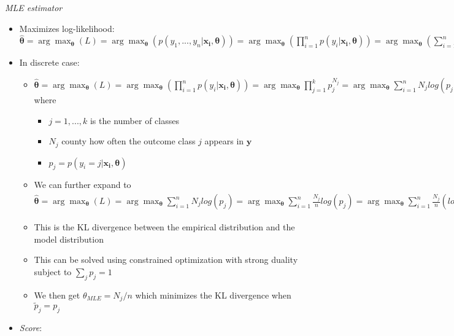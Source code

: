 \emph{MLE estimator}
\begin{itemize}
    \item Maximizes log-likelihood: $\hat{\boldsymbol{\theta}} = \arg\max_{\boldsymbol{\theta}}(L) = \arg\max_{\boldsymbol{\theta}}(p(y_1, ..., y_n |\boldsymbol{x_i}, \boldsymbol{\theta})) = \arg\max_{\boldsymbol{\theta}}(\prod_{i=1}^n p(y_i |\boldsymbol{x_i}, \boldsymbol{\theta})) = \arg\max_{\boldsymbol{\theta}}(\sum_{i=1}^n log(p(y_i |\boldsymbol{x_i}, \boldsymbol{\theta})))$
    \item In discrete case:
    \begin{itemize}
        \item $\hat{\boldsymbol{\theta}} = \arg\max_{\boldsymbol{\theta}}(L) = \arg\max_{\boldsymbol{\theta}}(\prod_{i=1}^n p(y_i |\boldsymbol{x_i}, \boldsymbol{\theta})) = \arg\max_{\boldsymbol{\theta}}\prod_{j=1}^k p_j^{N_j} = \arg\max_{\boldsymbol{\theta}} \sum_{i=1}^n N_j log(p_j)$ where
        \begin{itemize}
            \item $j = 1, ..., k$ is the number of classes
            \item $N_j$ county how often the outcome class $j$ appears in $\boldsymbol{y}$
            \item $p_j = p(y_i = j |\boldsymbol{x_i}, \boldsymbol{\theta})$
        \end{itemize}
        \item We can further expand to $\hat{\boldsymbol{\theta}} = \arg\max_{\boldsymbol{\theta}}(L) = \arg\max_{\boldsymbol{\theta}} \sum_{i=1}^n N_j log(p_j) = \arg\max_{\boldsymbol{\theta}} \sum_{i=1}^n \frac{N_j}{n} log(p_j) = \arg\max_{\boldsymbol{\theta}} \sum_{i=1}^n \frac{N_j}{n} (log(\frac{p_j}{N_j/n}) + log(N_j/n)) = \arg\max_{\boldsymbol{\theta}} \sum_{i=1}^n \frac{N_j}{n} log(\frac{p_j}{N_j/n}) = \arg\min_{\boldsymbol{\theta}} \sum_{i=1}^n \frac{N_j}{n} log(\frac{N_j/n}{p_j}) = \arg\min_{\boldsymbol{\theta}} \sum_{i=1}^n \tilde{p}_j log(\frac{\tilde{p}_j}{p_j})$
        \item This is the KL divergence between the empirical distribution and the model distribution 
        \item This can be solved using constrained optimization with strong duality subject to $\sum_j p_j = 1$
        \item We then get $\theta_{MLE} = N_j/n$ which minimizes the KL divergence when $\tilde{p}_j = p_j$
    \end{itemize}
    \item \emph{Score}: 

\end{itemize}
